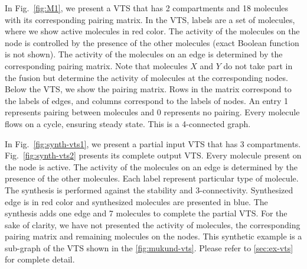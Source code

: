 \begin{example}
%
In Fig.~\ref{fig:M1}, we present a VTS that has 2 compartments and 18 molecules with its corresponding pairing matrix.
%
%
In the VTS, labels are a set of molecules, where we show active molecules in red color.
%
The activity of the molecules on the node is controlled
by the presence of the other molecules (exact Boolean function is not shown). 
%
The activity of the molecules on an edge is determined by the corresponding pairing matrix.
%
Note that molecules $X$ and $Y$ do not take part in the fusion but determine the activity of molecules at the corresponding nodes.
%
Below the VTS, we show the pairing matrix.
%
Rows in the matrix correspond to the labels of edges, and columns correspond to the labels of nodes.
%
An entry 1 represents pairing between molecules and 0 represents no pairing.
%
Every molecule flows on a cycle, ensuring steady state.
%
This is a 4-connected graph.
\end{example}

\begin{example}
	In Fig.~\ref{fig:synth-vts1}, we present a partial input VTS that has 3 compartments. Fig.~\ref{fig:synth-vts2} presents its complete output VTS. Every molecule present on the node is active. The activity of the molecules on an edge is determined by the presence of the other molecules. Each label represent particular type of molecule. The synthesis is performed against the stability and 3-connectivity. Synthesized edge is in red color and synthesized molecules are presented in blue. The synthesis adds one edge and 7 molecules to complete the partial VTS. For the sake of clarity, we have not presented the activity of molecules, the corresponding pairing matrix and remaining molecules on the nodes. This synthetic example is a sub-graph of the VTS shown in the \ref{fig:mukund-vts}. Please refer to \ref{sec:ex-vts} for complete detail. 
\end{example}

%
\label{subsec:graphmodel}
%
%
%


